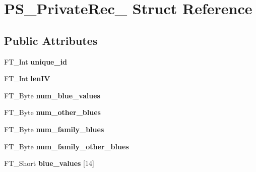 \hypertarget{struct_p_s___private_rec__}{\section{P\-S\-\_\-\-Private\-Rec\-\_\- Struct Reference}
\label{struct_p_s___private_rec__}
}
\subsection*{Public Attributes}
\begin{DoxyCompactItemize}
\item 
\hypertarget{struct_p_s___private_rec___ae862c1db170cfee85aa3242be9fa5d57}{F\-T\-\_\-\-Int {\bfseries unique\-\_\-id}}\label{struct_p_s___private_rec___ae862c1db170cfee85aa3242be9fa5d57}

\item 
\hypertarget{struct_p_s___private_rec___a796ebb92d96f0297ae584a911768db8b}{F\-T\-\_\-\-Int {\bfseries len\-I\-V}}\label{struct_p_s___private_rec___a796ebb92d96f0297ae584a911768db8b}

\item 
\hypertarget{struct_p_s___private_rec___ae3c56e75b5674451a7296cbb9f0a2e40}{F\-T\-\_\-\-Byte {\bfseries num\-\_\-blue\-\_\-values}}\label{struct_p_s___private_rec___ae3c56e75b5674451a7296cbb9f0a2e40}

\item 
\hypertarget{struct_p_s___private_rec___a149acdf871b0739f7ab13b1ac8e48a28}{F\-T\-\_\-\-Byte {\bfseries num\-\_\-other\-\_\-blues}}\label{struct_p_s___private_rec___a149acdf871b0739f7ab13b1ac8e48a28}

\item 
\hypertarget{struct_p_s___private_rec___a1e8a432c78f00034c73cfc54c787b10f}{F\-T\-\_\-\-Byte {\bfseries num\-\_\-family\-\_\-blues}}\label{struct_p_s___private_rec___a1e8a432c78f00034c73cfc54c787b10f}

\item 
\hypertarget{struct_p_s___private_rec___a7370e2e89f39f7ff8923f3d1befbcfce}{F\-T\-\_\-\-Byte {\bfseries num\-\_\-family\-\_\-other\-\_\-blues}}\label{struct_p_s___private_rec___a7370e2e89f39f7ff8923f3d1befbcfce}

\item 
\hypertarget{struct_p_s___private_rec___ae2c23ed06e54b680473f924483685425}{F\-T\-\_\-\-Short {\bfseries blue\-\_\-values} \mbox{[}14\mbox{]}}\label{struct_p_s___private_rec___ae2c23ed06e54b680473f924483685425}


\end{DoxyCompactItemize}
